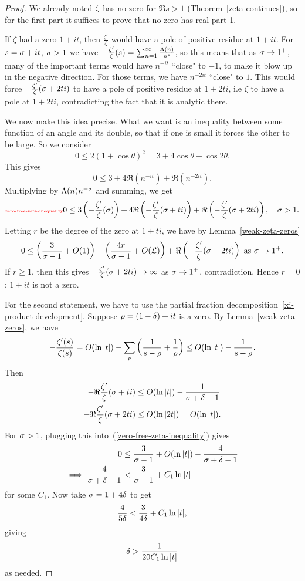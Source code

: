 \begin{proof}
We already noted $\zeta$ has no zero for $\Re s>1$ (Theorem~\ref{zeta-continues}), so for the first part it suffices to prove that no zero has real part 1.

If $\zeta$ had a zero $1+it$, then $\frac{\zeta'}{\zeta}$ would have a pole of positive residue at $1+it$. For $s=\sigma+it$, $\sigma>1$ we have $-\frac{\zeta'}{\zeta}(s)=\sum_{n=1}^{\infty} \frac{\Lambda(n)}{n^s}$, so this means that as $\sigma\to 1^+$,
many of the important terms would have $n^{-it}$ ``close" to $-1$, to make it blow up in the negative direction. For those terms, we have $n^{-2it}$ ``close" to $1$. This would force $-\frac{\zeta'}{\zeta}(\sigma+2ti)$ to have a pole of positive residue at $1+2ti$, i.e $\zeta$ to have a pole at $1+2ti$, contradicting the fact that it is analytic there.

We now make this idea precise. What we want is an inequality between some function of an angle and its double, so that if one is small it forces the other to be large. So we consider
\[
0\le 2(1+\cos\theta)^2=3+4\cos \theta +\cos 2\theta.
\]
This gives
\[
0\le 3+4\Re(n^{-it})+\Re(n^{-2it}).
\]
Multiplying by $\Lambda(n)n^{-\sigma}$ and summing, we get
\begin{equation}\llabel{zero-free-zeta-inequality}
0\le 3\pa{-\frac{\ze'}{\ze}(\si)} 
+4\Re\pa{-\frac{\ze'}{\ze}(\si+ti)}
+\Re\pa{-\frac{\ze'}{\ze}(\si+2ti)},\quad\si>1.
\end{equation}
Letting $r$ be the degree of the zero at $1+ti$, we have by Lemma~\ref{weak-zeta-zeros}
\[
0\le\left( {\frac{3}{\sigma-1}+O(1)} \right)
-\left( {\frac{4r}{\sigma-1}+O(\mathcal{L})} \right)
+\Re\left( {-\frac{\zeta'}{\zeta}(\sigma+2ti)} \right)\text{ as }\sigma\to 1^+.
\]
If $r\ge 1$, then this gives $-\frac{\zeta'}{\zeta}(\sigma+2ti)\to \infty$ as $\sigma\to 1^+$, contradiction. Hence $r=0$; $1+it$ is not a zero.

For the second statement, we have to use the partial fraction decomposition~\ref{xi-product-development}.
Suppose $\rho=(1-\delta)+it$ is a zero. By Lemma~\ref{weak-zeta-zeros}, we have
\[
-\frac{\zeta'(s)}{\zeta(s)} = O(\ln|t|) -\sum_{\rho}\left( {\frac{1}{s-\rho}+\frac{1}{\rho}} \right)\le O(\ln|t|)-\frac{1}{s-\rho}.
\]
Then
\begin{align*}
-\Re\frac{\zeta'}{\zeta}(\sigma+ti)&\le O(\ln|t|)-\frac{1}{\sigma+\delta-1}\\
-\Re\frac{\zeta'}{\zeta}(\sigma+2ti)&\le O(\ln|2t|)=O(\ln |t|).
\end{align*}
For $\sigma>1$, plugging this into~(\ref{zero-free-zeta-inequality}) gives
\begin{align*}
0&\le \frac{3}{\sigma-1}+O(\ln|t|)-\frac{4}{\sigma+\delta-1}\\
\implies \frac{4}{\sigma+\delta-1}&<\frac{3}{\sigma-1}+C_1\ln|t|
\end{align*}
for some $C_1$.
Now take $\sigma=1+4\delta$ to get
\[
\frac{4}{5\delta}<\frac{3}{4\delta}+C_1\ln|t|,
\]
giving
\[
\delta>\frac{1}{20C_1\ln|t|}
\]
as needed.
\end{proof}
